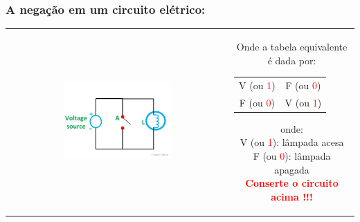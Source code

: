 \documentclass{beamer}
\begin{document}
\begin{frame}
\frametitle{A \textbf{negação} em um circuito elétrico:}

\begin{tabular}{c||c}  
 
 \includegraphics[height=0.5\textheight,width=0.5\textwidth]{figuras/circuito_NOT.jpg} 
 
  &
  \parbox{0.4\linewidth}{\vspace{-4cm} Onde a tabela equivalente é dada por:
  \begin{tabular}{|c|c|}
	\hline
	$\mathbf{A}$ & $\mathbf{\sim A}$ \\
	\hline
	V (ou  \textcolor{red}{1}) & F (ou \textcolor{red}{0}) \\
	\hline
	F (ou \textcolor{red}{0}) & V (ou \textcolor{red}{1})  \\
	\hline
	\end{tabular}
	onde:\\
	V (ou  \textcolor{red}{1}): lâmpada acesa\\
	F (ou \textcolor{red}{0}): lâmpada apagada\\
	\textbf{\textcolor{red}{Conserte o circuito acima !!!}}
  } %

\end{tabular} 	

\end{frame}
\end{document}
